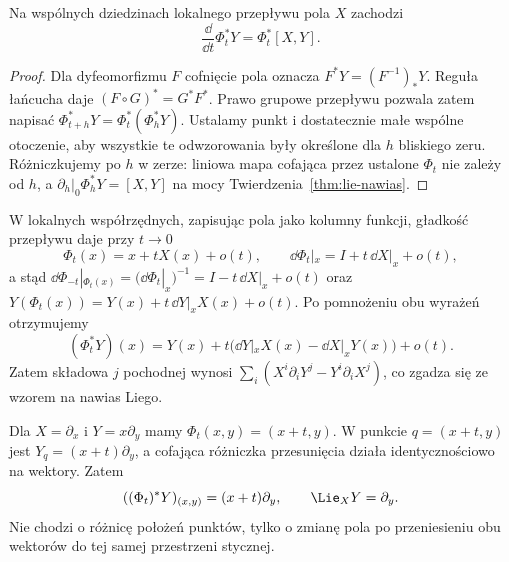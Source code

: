 \begin{stwierdzenie}\label{prop:lie-ewolucja}
Na wspólnych dziedzinach lokalnego przepływu pola $X$ zachodzi
\[
 \frac{\dd}{\dd t}\Phi_t^*Y=\Phi_t^*[X,Y].
\]
\end{stwierdzenie}
\begin{proof}
Dla dyfeomorfizmu $F$ cofnięcie pola oznacza $F^*Y=(F^{-1})_*Y$.
Reguła łańcucha daje $(F\circ G)^*=G^*F^*$.
Prawo grupowe przepływu pozwala zatem napisać
$\Phi_{t+h}^*Y=\Phi_t^*(\Phi_h^*Y)$.
Ustalamy punkt i dostatecznie małe wspólne otoczenie, aby
wszystkie te odwzorowania były określone dla $h$ bliskiego zeru.
Różniczkujemy po $h$ w zerze: liniowa mapa cofająca przez
ustalone $\Phi_t$ nie zależy od $h$, a
$\left.\partial_h\right|_0\Phi_h^*Y=[X,Y]$
na mocy Twierdzenia~\ref{thm:lie-nawias}.
\end{proof}

\begin{uwaga}
W lokalnych współrzędnych, zapisując pola jako kolumny funkcji,
gładkość przepływu daje przy $t\to0$
\[
 \Phi_t(x)=x+tX(x)+o(t),\qquad
 \dd\Phi_t|_x=I+t\,\dd X|_x+o(t),
\]
a stąd $\dd\Phi_{-t}|_{\Phi_t(x)}=(\dd\Phi_t|_x)^{-1}
=I-t\,\dd X|_x+o(t)$ oraz
$Y(\Phi_t(x))=Y(x)+t\,\dd Y|_xX(x)+o(t)$.
Po pomnożeniu obu wyrażeń otrzymujemy
\[
 (\Phi_t^*Y)(x)=Y(x)+t\bigl(\dd Y|_xX(x)-\dd X|_xY(x)\bigr)+o(t).
\]
Zatem składowa $j$ pochodnej wynosi
$\sum_i(X^i\partial_iY^j-Y^i\partial_iX^j)$,
co zgadza się ze wzorem na nawias Liego.
\end{uwaga}

\begin{przyklad}
Dla $X=\partial_x$ i $Y=x\partial_y$ mamy
$\Phi_t(x,y)=(x+t,y)$. W punkcie $q=(x+t,y)$ jest
$Y_q=(x+t)\partial_y$, a cofająca różniczka przesunięcia
działa identycznościowo na wektory. Zatem
\[
 ((\Phi_t)^*Y)_{(x,y)}=(x+t)\partial_y,
 \qquad \Lie_XY=\partial_y.
\]
Nie chodzi o różnicę położeń punktów, tylko o zmianę pola
po przeniesieniu obu wektorów do tej samej przestrzeni stycznej.
\end{przyklad}

